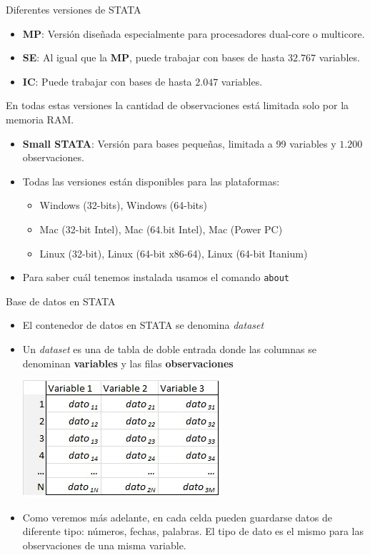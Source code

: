 \documentclass{beamer}
\begin{document}
\begin{frame}{Diferentes versiones de STATA}
\begin{itemize}
\item \textbf{MP}: Versión diseñada especialmente para procesadores dual-core o multicore.
\item \textbf{SE}: Al igual que la \textbf{MP}, puede trabajar con bases de hasta $32.767$ variables. 
\item \textbf{IC}: Puede trabajar con bases de hasta $2.047$ variables. 
\end{itemize}
En todas estas versiones la cantidad de observaciones está limitada solo por la memoria RAM.
\begin{itemize}
\item \textbf{Small STATA}: Versión para bases pequeñas, limitada a 99 variables y $1.200$ observaciones.
\item Todas las versiones están disponibles para las plataformas:
\begin{itemize}
\item Windows (32-bits), Windows (64-bits)
\item Mac (32-bit Intel), Mac (64.bit Intel), Mac (Power PC)
\item Linux (32-bit), Linux (64-bit x86-64), Linux (64-bit Itanium)
\end{itemize}
\item Para saber cuál tenemos instalada usamos el comando \texttt{about}
\end{itemize}
\end{frame}



\begin{frame}{Base de datos en STATA}
\begin{itemize}
\item El contenedor de datos en STATA se denomina \textit{dataset}
\item Un \textit{dataset} es una de tabla de doble entrada donde las columnas se denominan \textbf{variables} y las filas \textbf{observaciones}\\
\begin{center}
\smallskip
\includegraphics[height=2.3 cm]{base.jpg}
\smallskip
\end{center}
\item Como veremos más adelante, en cada celda pueden guardarse datos de diferente tipo: números, fechas, palabras. El tipo de dato es el mismo para las observaciones de una misma variable.
\end{itemize}
\end{frame}
\end{document}

